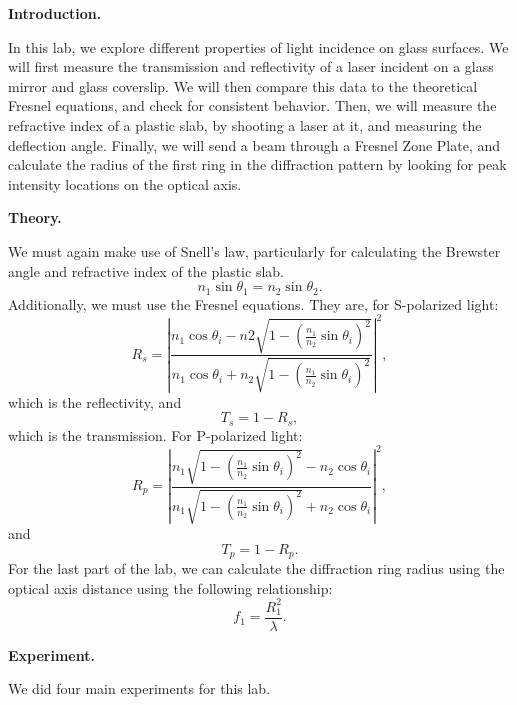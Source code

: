 \documentclass{article}
\newcommand{\labhead}[1]{
  \vspace{1em}
  {\bf #1}$_{\,}$
  \hline
  \vspace{1em}
}
\begin{document}
\rhead{\thepage} 
\pagestyle{fancy} 
\fancyfoot[c]{} 
\setlength{\parindent}{0pt}

\begin{multicols*}{2}
\labhead{Introduction.}
In this lab, we explore different properties of light incidence on glass surfaces. We will first measure the
transmission and reflectivity of a laser incident on a glass mirror and glass coverslip. We will then compare this data
to the theoretical Fresnel equations, and check for consistent behavior. Then, we will measure the refractive index of a
plastic slab, by shooting a laser at it, and measuring the deflection angle. Finally, we will send a beam through a
Fresnel Zone Plate, and calculate the radius of the first ring in the diffraction pattern by looking for peak intensity
locations on the optical axis.

\labhead{Theory.}
We must again make use of Snell's law, particularly for calculating the Brewster angle and refractive index of the plastic slab.
\begin{equation}
  \label{equation:snells}
  n_1 \sin{\theta_1} = n_2 \sin{\theta_2}.
\end{equation}
Additionally, we must use the Fresnel equations. They are, for S-polarized light:
\begin{equation}
  \label{equation:rs}
  R_s = \left| \frac{n_1 \cos\theta_i - n2\sqrt{1-\left(\frac{n_1}{n_2}\sin\theta_i\right)^2}}{n_1 \cos\theta_i+n_2\sqrt{1-\left(\frac{n_1}{n_2}\sin\theta_i\right)^2}}\right|^2,
\end{equation}
which is the reflectivity, and 
\begin{equation}
  \label{equation:ts}
  T_s = 1 - R_s,
\end{equation}
which is the transmission. For P-polarized light:
\begin{equation}
  \label{equation:rp}
  R_p = \left| \frac{n_1 \sqrt{1-\left(\frac{n_1}{n_2}\sin\theta_i\right)^2} - n_2 \cos\theta_i}{n_1\sqrt{1-\left(\frac{n_1}{n_2}\sin\theta_i\right)^2}+n_2\cos\theta_i}\right|^2,
\end{equation}
and
\begin{equation}
  \label{equation:tp}
  T_p = 1 - R_p.
\end{equation}
For the last part of the lab, we can calculate the diffraction ring radius using the optical axis distance using the following relationship:
\begin{equation}
  \label{equation:frz}
  f_1 = \frac{R_1^2}{\lambda}.
\end{equation}
\labhead{Experiment.}
We did four main experiments for this lab. 



\end{multicols*}
\end{document}
